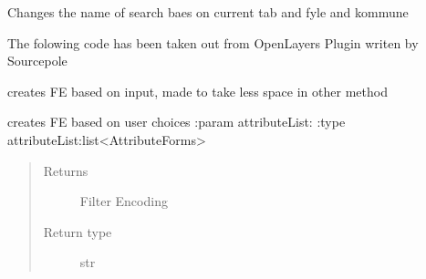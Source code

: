 \documentclass[letterpaper,10pt,english]{sphinxmanual}
\begin{document}
\begin{fulllineitems}
\begin{fulllineitems}
\end{fulllineitems}


\begin{fulllineitems}
\label{\detokenize{code:Tilgjengelighet.Tilgjengelighet.change_search_name}}
Changes the name of search baes on current tab and fyle and kommune

\end{fulllineitems}


\begin{fulllineitems}
\label{\detokenize{code:Tilgjengelighet.Tilgjengelighet.createGdalTmsLayer}}
The folowing code has been taken out from OpenLayers Plugin writen by Sourcepole

\end{fulllineitems}


\begin{fulllineitems}
\label{\detokenize{code:Tilgjengelighet.Tilgjengelighet.create_filter}}
creates FE based on input, made to take less space in other method

\end{fulllineitems}


\begin{fulllineitems}
\label{\detokenize{code:Tilgjengelighet.Tilgjengelighet.create_filtherencoding}}
creates FE based on user choices
:param attributeList:
:type attributeList:list\textless{}AttributeForms\textgreater{}
\begin{quote}\begin{description}
\item[{Returns}] \leavevmode
Filter Encoding

\item[{Return type}] \leavevmode
str


\end{description}
\end{quote}
\end{fulllineitems}
\end{fulllineitems}
\end{document}
